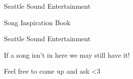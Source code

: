 \documentclass[8pt]{article}
\def \TitlePageText {Seattle Sound Entertainment} %
\def \TitlePageSubText {Song Inspiration Book} %
\def \TitlePageTextFont {\sqrcfamily}
\def \TitlePageSubTextFont {\sffamily}
\begin{document}
\begin{titlepage}
    \centering %
    \vspace*{\fill} %
    {\Huge \TitlePageTextFont \TitlePageText \par} %
    \vspace{1em}
    {\LARGE \TitlePageSubTextFont \TitlePageSubText \par} %
    \vspace*{\fill} %
\end{titlepage}

\begin{titlepage}
    \centering %
    \vspace*{\fill} %
    {\Huge \TitlePageTextFont \TitlePageText \par} %
    \vspace*{\fill} %
\end{titlepage}

\begin{titlepage}
    \centering %
    \vspace*{\fill} %
    {\LARGE \TitlePageSubTextFont If a song isn't in here we may still have it! \par} %
    \vspace{1em}
    {\LARGE \TitlePageSubTextFont Feel free to come up and ask <3 \par} %
    \vspace*{\fill} %
\end{titlepage}
\end{document}
